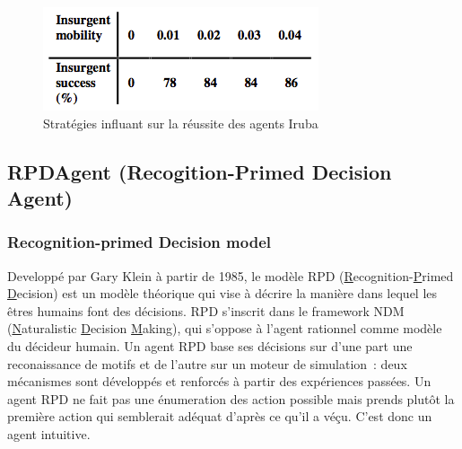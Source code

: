 \documentclass{article}
\begin{document}
\begin{center}
\begin{figure}[H]
\begin{minipage}[H]{0.4\linewidth}
\end{minipage}
\hfill
\begin{minipage}[H]{0.4\linewidth}
	\centering
	\includegraphics[width=\linewidth]{../ressources/iruba_mobility}
\end{minipage}
\caption{Stratégies influant sur la réussite des agents Iruba}
\end{figure}
\end{center}

\subsection{RPDAgent (Recogition-Primed Decision Agent)}
\subsubsection{Recognition-primed Decision model}
Developpé par Gary Klein à partir de 1985, le modèle RPD (\underline{R}ecognition-\underline{P}rimed \underline{D}ecision) est un modèle théorique qui vise à décrire la manière dans lequel les êtres humains font des décisions. RPD s'inscrit dans le framework NDM (\underline{N}aturalistic \underline{D}ecision \underline{M}aking), qui s'oppose à l'agent rationnel comme modèle du décideur humain.
Un agent RPD base ses décisions sur d'une part une reconaissance de motifs et de l'autre sur un moteur de simulation~: deux mécanismes sont développés et renforcés à partir des expériences passées. Un agent RPD ne fait pas une énumeration des action possible mais prends plutôt la première action qui semblerait adéquat d'après ce qu'il a véçu. C'est donc un agent \og{}intuitive\fg{}.
\end{document}
